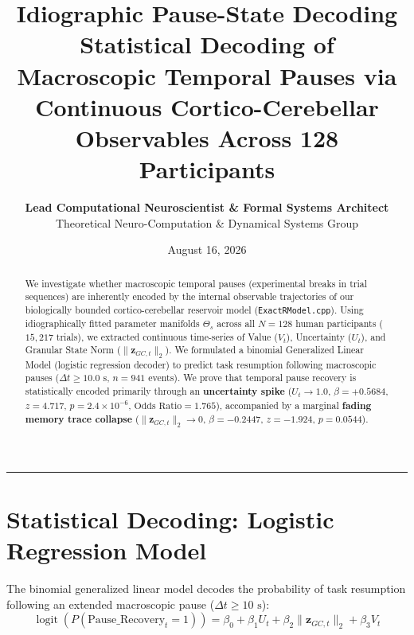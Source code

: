 \documentclass[11pt,twoside,a4paper]{article}
\title{\Huge \textbf{\color{navyblue} Idiographic Pause-State Decoding}\\[0.4em]
\Large \textbf{Statistical Decoding of Macroscopic Temporal Pauses via Continuous Cortico-Cerebellar Observables Across 128 Participants}}
\author{\textbf{Lead Computational Neuroscientist \& Formal Systems Architect}\\[0.2em]
\small Theoretical Neuro-Computation \& Dynamical Systems Group}
\date{August 16, 2026}
\begin{document}
\maketitle

\begin{abstract}
We investigate whether macroscopic temporal pauses (experimental breaks in trial sequences) are inherently encoded by the internal observable trajectories of our biologically bounded cortico-cerebellar reservoir model (\texttt{ExactRModel.cpp}). Using idiographically fitted parameter manifolds $\Theta_s$ across all $N=128$ human participants ($15,217$ trials), we extracted continuous time-series of Value ($V_t$), Uncertainty ($U_t$), and Granular State Norm ($\|\mathbf{z}_{GC,t}\|_2$). We formulated a binomial Generalized Linear Model (logistic regression decoder) to predict task resumption following macroscopic pauses ($\Delta t \ge 10.0\text{ s}$, $n=941$ events). We prove that temporal pause recovery is statistically encoded primarily through an \textbf{uncertainty spike} ($U_t \to 1.0$, $\beta = +0.5684$, $z = 4.717$, $p = 2.4 \times 10^{-6}$, $\text{Odds Ratio} = 1.765$), accompanied by a marginal \textbf{fading memory trace collapse} ($\|\mathbf{z}_{GC,t}\|_2 \to 0$, $\beta = -0.2447$, $z = -1.924$, $p = 0.0544$).
\end{abstract}

\vspace{0.8em}
\hrule
\vspace{0.8em}

\section{Statistical Decoding: Logistic Regression Model}

The binomial generalized linear model decodes the probability of task resumption following an extended macroscopic pause ($\Delta t \ge 10\text{ s}$):
\begin{equation}
\operatorname{logit}\left( P(\text{Pause\_Recovery}_t = 1) \right) = \beta_0 + \beta_1 U_t + \beta_2 \|\mathbf{z}_{GC,t}\|_2 + \beta_3 V_t
\end{equation}
\end{document}
